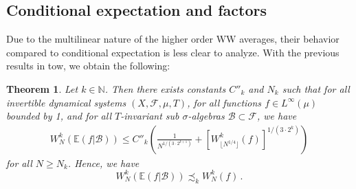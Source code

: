 \documentclass[11pt, oneside]{amsart}   	%
\newcommand{\E}{\mathbb{E}}
\newcommand{\1}{\mathbbm{1}}
\newcommand{\N}{\mathbb{N}}
\newcommand{\floor}[1]{\lfloor#1\rfloor}
\newtheorem{theorem}{Theorem}[section]
\theoremstyle{definition}
\begin{document}
\subsection{Conditional expectation and factors}\label{S:conditioning}

Due to the multilinear nature of the higher order WW averages, their behavior compared to conditional expectation is less clear to analyze. With the previous results in tow, we obtain the following:

\begin{theorem}\label{T:conditional exp}
Let $k\in \N$. Then there exists constants $C''_k$ and $N_k$ such that for all invertible dynamical systems $(X, \mathcal{F}, \mu, T)$, for all functions $f\in L^\infty(\mu)$ bounded by 1, and for all $T$-invariant sub $\sigma$-algebras $\mathcal{B} \subset \mathcal{F}$, we have
\begin{align*}
W_N^k\left(\E(f |\mathcal{B})\right) \leq C''_k \left(\frac{1}{N^{1/(3\cdot 2^{k+1})}} + \left[W_{\floor{N^{1/4}}}^k(f)\right]^{1/(3\cdot 2^{k})} \right)
\end{align*}
for all $N\geq N_k$. Hence, we have
$$W_N^k\left(\E(f |\mathcal{B})\right) \precsim_k W_N^k(f)\, .$$
\end{theorem}
\end{document}
